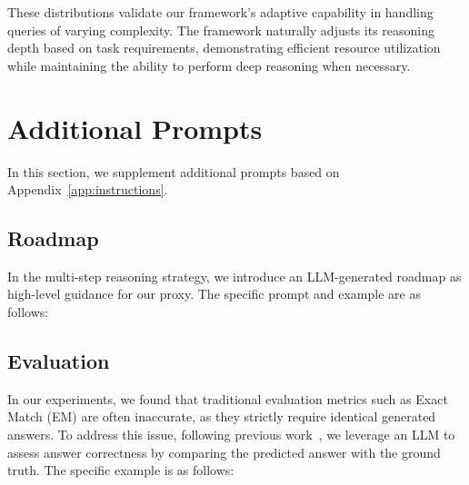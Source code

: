 These distributions validate our framework's adaptive capability in handling queries of varying complexity. The framework naturally adjusts its reasoning depth based on task requirements, demonstrating efficient resource utilization while maintaining the ability to perform deep reasoning when necessary.


\section{Additional Prompts}
In this section, we supplement additional prompts based on Appendix~\ref{app:instructions}.


\subsection{Roadmap}
In the multi-step reasoning strategy, we introduce an LLM-generated roadmap as high-level guidance for our proxy. 
The specific prompt and example are as follows:



\subsection{Evaluation}
In our experiments, we found that traditional evaluation metrics such as Exact Match (EM) are often inaccurate, as they strictly require identical generated answers.
To address this issue, following previous work~\citep{ZhengC00WZL0LXZ23,VuI0CWWTSZLL24}, we leverage an LLM to assess answer correctness by comparing the predicted answer with the ground truth.
The specific example is as follows:

